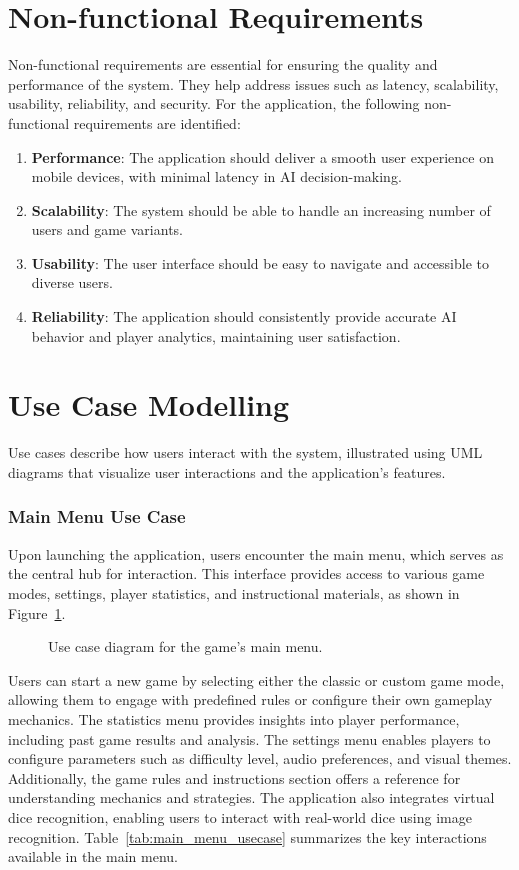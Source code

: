 \section{Non-functional Requirements}
Non-functional requirements are essential for ensuring the quality and performance of the system. They help address issues such as latency, scalability, usability, reliability, and security. For the application, the following non-functional requirements are identified:
\begin{enumerate}
\item {\bfseries Performance}: The application should deliver a smooth user experience on mobile devices, with minimal latency in AI decision-making.
\item {\bfseries Scalability}: The system should be able to handle an increasing number of users and game variants.
\item {\bfseries Usability}: The user interface should be easy to navigate and accessible to diverse users.
\item {\bfseries Reliability}: The application should consistently provide accurate AI behavior and player analytics, maintaining user satisfaction.
\end{enumerate}

\section{Use Case Modelling}
Use cases describe how users interact with the system, illustrated using UML diagrams that visualize user interactions and the application's features.

\subsubsection{Main Menu Use Case}
Upon launching the application, users encounter the main menu, which serves as the central hub for interaction. This interface provides access to various game modes, settings, player statistics, and instructional materials, as shown in Figure~\ref{fig:main_menu_usecase}.

\begin{figure}[ht!]
    \centering
    
    \caption{Use case diagram for the game's main menu.}
    \label{fig:main_menu_usecase}
\end{figure}

Users can start a new game by selecting either the classic or custom game mode, allowing them to engage with predefined rules or configure their own gameplay mechanics. The statistics menu provides insights into player performance, including past game results and analysis. The settings menu enables players to configure parameters such as difficulty level, audio preferences, and visual themes. Additionally, the game rules and instructions section offers a reference for understanding mechanics and strategies. The application also integrates virtual dice recognition, enabling users to interact with real-world dice using image recognition. Table~\ref{tab:main_menu_usecase} summarizes the key interactions available in the main menu.

